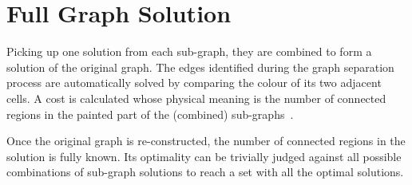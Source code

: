 \documentclass[journal]{IEEEtran}
\begin{document}
\section{Full Graph Solution}\label{section_full_graph}
Picking up one solution from each sub-graph, they are combined to form a solution of the original graph. 
The edges identified during the graph separation process are automatically solved by comparing the colour of its two adjacent cells. 
A cost is calculated whose physical meaning is the number of connected regions in the painted part of the (combined) sub-graphs~\cite{Yang2020Cellular}. 

Once the original graph is re-constructed, the number of connected regions in the solution is fully known. Its optimality can be trivially judged against all possible combinations of sub-graph solutions to reach a set with all the optimal solutions. 
\end{document}
